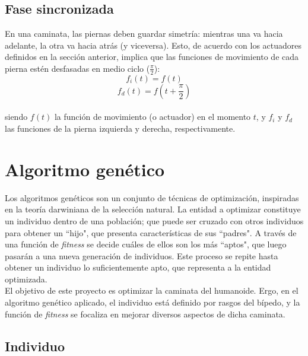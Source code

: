 \documentclass{article}
\begin{document}
\subsection{Fase sincronizada}
En una caminata, las piernas deben guardar simetr\'ia: mientras una va hacia adelante, la otra va hacia atr\'as (y viceversa). Esto, de acuerdo con  los actuadores definidos en la secci\'on anterior, implica que las funciones de movimiento de cada pierna est\'en desfasadas en medio ciclo ($\frac{\pi}{2}$):
\begin{equation}
f_{i}(t) =  f(t)
 \end{equation}
 \begin{equation}
f_{d}(t) =  f(t+\frac{\pi}{2})
 \end{equation}
 \\
siendo $f(t)$ la funci\'on de movimiento (o actuador) en el momento $t$, y $f_{i}$ y $f_{d}$ las funciones de la pierna izquierda y derecha, respectivamente.



\section{Algoritmo gen\'etico}

Los algoritmos gen\'eticos son un conjunto de t\'ecnicas de optimizaci\'on, inspiradas en la teor\'ia darwiniana de la selecci\'on natural. La entidad a optimizar constituye un individuo dentro de una poblaci\'on; que puede ser cruzado con otros individuos para obtener un ``hijo", que presenta caracter\'isticas de sus ``padres". A trav\'es de una funci\'on de \textit{fitness} se decide cu\'ales de ellos son los m\'as ``aptos", que luego pasar\'an a una nueva generaci\'on de individuos. Este proceso se repite hasta obtener un individuo lo suficientemente apto, que representa a la entidad optimizada.\\
El objetivo de este proyecto es optimizar la caminata del humanoide. Ergo, en el algoritmo gen\'etico aplicado, el individuo est\'a definido por rasgos del b\'ipedo, y la funci\'on de \textit{fitness} se focaliza en mejorar diversos aspectos de dicha caminata.

\subsection{Individuo}
\end{document}
